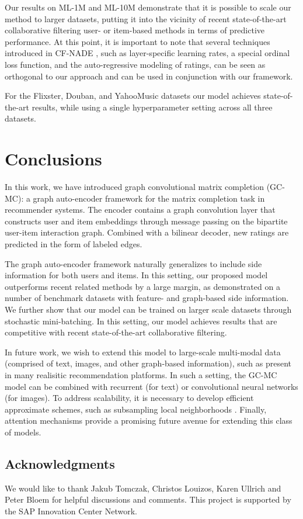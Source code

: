 \documentclass[twoside]{article}
\begin{document}
Our results on ML-1M and ML-10M demonstrate that it is possible to scale our method to larger datasets, putting it into the vicinity of recent state-of-the-art collaborative filtering user- or item-based methods in terms of predictive performance. At this point, it is important to note that several techniques introduced in CF-NADE \cite{zheng2016neural}, such as layer-specific learning rates, a special ordinal loss function, and the auto-regressive modeling of ratings, can be seen as orthogonal to our approach and can be used in conjunction with our framework.

For the Flixster, Douban, and YahooMusic datasets our model achieves state-of-the-art results, while using a single hyperparameter setting across all three datasets.

 
\section{Conclusions}
\label{sec:conc}


In this work, we have introduced graph convolutional matrix completion (GC-MC): a graph auto-encoder framework for the matrix completion task in recommender systems. The encoder contains a graph convolution layer that constructs user and item embeddings through message passing on the bipartite user-item interaction graph. Combined with a bilinear decoder, new ratings are predicted in the form of labeled edges.  

The graph auto-encoder framework naturally generalizes to include side information for both users and items.
In this setting, our proposed model outperforms recent related methods by a large margin, as demonstrated on a number of benchmark datasets with feature- and graph-based side information. We further show that our model can be trained on larger scale datasets through stochastic mini-batching. In this setting, our model achieves results that are competitive with recent state-of-the-art collaborative filtering.

In future work, we wish to extend this model to large-scale multi-modal data (comprised of text, images, and other graph-based information), such as present in many realisitic recommendation platforms. In such a setting, the GC-MC model can be combined with recurrent (for text) or convolutional neural networks (for images). To address scalability, it is necessary to develop efficient approximate schemes, such as subsampling local neighborhoods \cite{hamilton2017inductive}. Finally, attention mechanisms \cite{bahdanau2014neural} provide a promising future avenue for extending this class of models.
 
\subsection*{Acknowledgments}
We would like to thank Jakub Tomczak, Christos Louizos, Karen Ullrich and Peter Bloem for helpful discussions and comments.
This project is supported by the SAP Innovation
Center Network.

\begin{spacing}{0.9}
{\small


}
\end{spacing}
\end{document}
